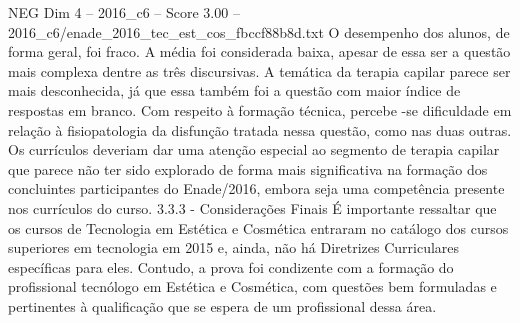 \begin{textsample}{NEG Dim 4 – 2016\_c6 – Score 3.00 – 2016\_c6/enade\_2016\_tec\_est\_cos\_fbccf88b8d.txt}
O desempenho dos alunos, de forma geral, foi fraco.
A média foi considerada baixa, apesar de essa ser a questão mais complexa dentre as três discursivas.
A temática da terapia capilar parece ser mais desconhecida, já que essa também foi a questão com maior índice de respostas em branco.
Com respeito à formação técnica, percebe -se dificuldade em relação à fisiopatologia da disfunção tratada nessa questão, como nas duas outras.
Os currículos deveriam dar uma atenção especial ao segmento de terapia capilar que parece não ter sido explorado de forma mais significativa na formação dos concluintes participantes do Enade/2016, embora seja uma competência presente nos currículos do curso. 3.3.3 - Considerações Finais É importante ressaltar que os cursos de Tecnologia em Estética e Cosmética entraram no catálogo dos cursos superiores em tecnologia em 2015 e, ainda, não há Diretrizes Curriculares específicas para eles.
Contudo, a prova foi condizente com a formação do profissional tecnólogo em Estética e Cosmética, com questões bem formuladas e pertinentes à qualificação que se espera de um profissional dessa área.

\end{textsample}
